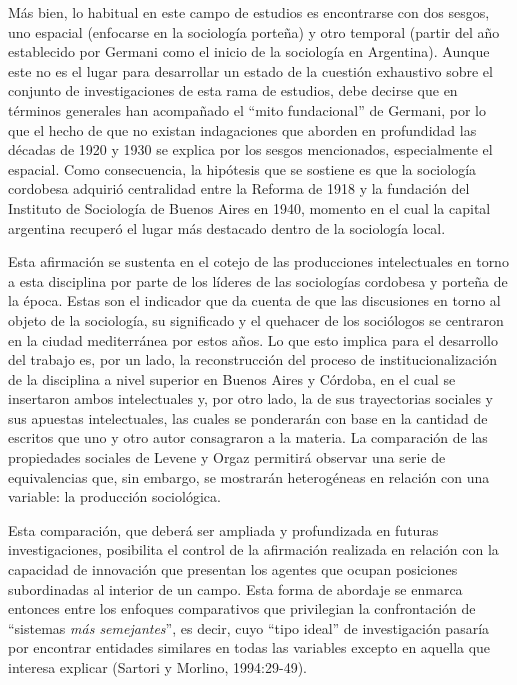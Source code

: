 Más bien, lo habitual en este campo de estudios es encontrarse con dos sesgos, uno espacial (enfocarse en la sociología porteña) y otro temporal (partir del año establecido por Germani como el inicio de la sociología en Argentina). Aunque este no es el lugar para desarrollar un estado de la cuestión exhaustivo sobre el conjunto de investigaciones de esta rama de estudios, debe decirse que en términos generales han acompañado el \enquote{mito fundacional} de Germani, por lo que el hecho de que no existan indagaciones que aborden en profundidad las décadas de 1920 y 1930 se explica por los sesgos mencionados, especialmente el espacial. Como consecuencia, la hipótesis que se sostiene es que la sociología cordobesa adquirió centralidad entre la Reforma de 1918 y la fundación del Instituto de Sociología de Buenos Aires en 1940, momento en el cual la capital argentina recuperó el lugar más destacado dentro de la sociología local.

Esta afirmación se sustenta en el cotejo de las producciones intelectuales en torno a esta disciplina por parte de los líderes de las sociologías cordobesa y porteña de la época. Estas son el indicador que da cuenta de que las discusiones en torno al objeto de la sociología, su significado y el quehacer de los sociólogos se centraron en la ciudad mediterránea por estos años. Lo que esto implica para el desarrollo del trabajo es, por un lado, la reconstrucción del proceso de institucionalización de la disciplina a nivel superior en Buenos Aires y Córdoba, en el cual se insertaron ambos intelectuales y, por otro lado, la de sus trayectorias sociales y sus apuestas intelectuales, las cuales se ponderarán con base en la cantidad de escritos que uno y otro autor consagraron a la materia. La comparación de las propiedades sociales de Levene y Orgaz permitirá observar una serie de equivalencias que, sin embargo, se mostrarán heterogéneas en relación con una variable: la producción sociológica.

Esta comparación, que deberá ser ampliada y profundizada en futuras investigaciones, posibilita el control de la afirmación realizada en relación con la capacidad de innovación que presentan los agentes que ocupan posiciones subordinadas al interior de un campo. Esta forma de abordaje se enmarca entonces entre los enfoques comparativos que privilegian la confrontación de \enquote{sistemas \emph{más semejantes}}, es decir, cuyo \enquote{tipo ideal} de investigación pasaría por encontrar entidades similares en todas las variables excepto en aquella que interesa explicar (Sartori y Morlino, 1994:29-49).

